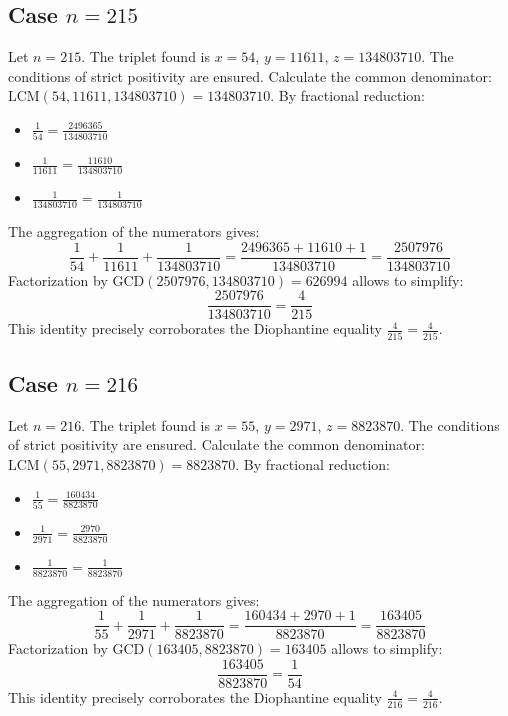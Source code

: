 \documentclass[11pt,a4paper]{article}
\begin{document}
\subsection{Case $n = 215$}
Let $n = 215$. The triplet found is $x = 54$, $y = 11611$, $z = 134803710$.
The conditions of strict positivity are ensured.
Calculate the common denominator: $\text{LCM}(54, 11611, 134803710) = 134803710$.
By fractional reduction:
\begin{itemize}
    \item $\frac{1}{54} = \frac{2496365}{134803710}$
    \item $\frac{1}{11611} = \frac{11610}{134803710}$
    \item $\frac{1}{134803710} = \frac{1}{134803710}$
\end{itemize}
The aggregation of the numerators gives:
$$ \frac{1}{54} + \frac{1}{11611} + \frac{1}{134803710} = \frac{2496365 + 11610 + 1}{134803710} = \frac{2507976}{134803710} $$
Factorization by $\text{GCD}(2507976, 134803710) = 626994$ allows to simplify:
$$ \frac{2507976}{134803710} = \frac{4}{215} $$
This identity precisely corroborates the Diophantine equality $\frac{4}{215} = \frac{4}{215}$.

\subsection{Case $n = 216$}
Let $n = 216$. The triplet found is $x = 55$, $y = 2971$, $z = 8823870$.
The conditions of strict positivity are ensured.
Calculate the common denominator: $\text{LCM}(55, 2971, 8823870) = 8823870$.
By fractional reduction:
\begin{itemize}
    \item $\frac{1}{55} = \frac{160434}{8823870}$
    \item $\frac{1}{2971} = \frac{2970}{8823870}$
    \item $\frac{1}{8823870} = \frac{1}{8823870}$
\end{itemize}
The aggregation of the numerators gives:
$$ \frac{1}{55} + \frac{1}{2971} + \frac{1}{8823870} = \frac{160434 + 2970 + 1}{8823870} = \frac{163405}{8823870} $$
Factorization by $\text{GCD}(163405, 8823870) = 163405$ allows to simplify:
$$ \frac{163405}{8823870} = \frac{1}{54} $$
This identity precisely corroborates the Diophantine equality $\frac{4}{216} = \frac{4}{216}$.
\end{document}
